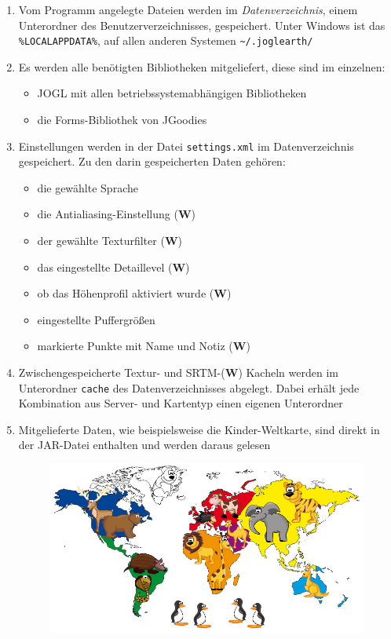 \documentclass[10pt]{scrreprt}
\newcommand{\sfbf}[1]{\textbf{\sffamily #1}}
\newcommand{\W}{\sfbf{W}}
\begin{document}
\begin{enumerate}[leftmargin=2cm]
\item Vom Programm angelegte Dateien werden im \textit{Datenverzeichnis}, einem Unterordner des Benutzerverzeichnisses, gespeichert. Unter Windows ist das \texttt{\%LOCALAPPDATA\%}, auf allen anderen Systemen \texttt{\textasciitilde/.joglearth/}
\item Es werden alle benötigten Bibliotheken mitgeliefert, diese sind im einzelnen: 
\begin{itemize}
\item JOGL mit allen betriebssystemabhängigen Bibliotheken
\item die Forms-Bibliothek von JGoodies
\end{itemize}
\item Einstellungen werden in der Datei \texttt{settings.xml} im Datenverzeichnis gespeichert. Zu den darin gespeicherten Daten gehören:
\begin{itemize}
\item die gewählte Sprache
\item die Antialiasing-Einstellung (\W)
\item der gewählte Texturfilter (\W)
\item das eingestellte Detaillevel (\W)
\item ob das Höhenprofil aktiviert wurde (\W)
\item eingestellte Puffergrößen
\item markierte Punkte mit Name und Notiz (\W)
\end{itemize}
\item Zwischengespeicherte Textur- und SRTM-(\W) Kacheln werden im Unterordner \texttt{cache} des Datenverzeichnisses abgelegt. Dabei erhält jede Kombination aus Server- und Kartentyp einen eigenen Unterordner
\item Mitgelieferte Daten, wie beispielsweise die Kinder-Weltkarte, sind direkt in der JAR-Datei enthalten und werden daraus gelesen
\begin{figure}[!htb]
	\centering
	\includegraphics[scale=0.3]{Kinder-Weltkarte.jpg}
\end{figure}
\end{enumerate}
\end{document}
